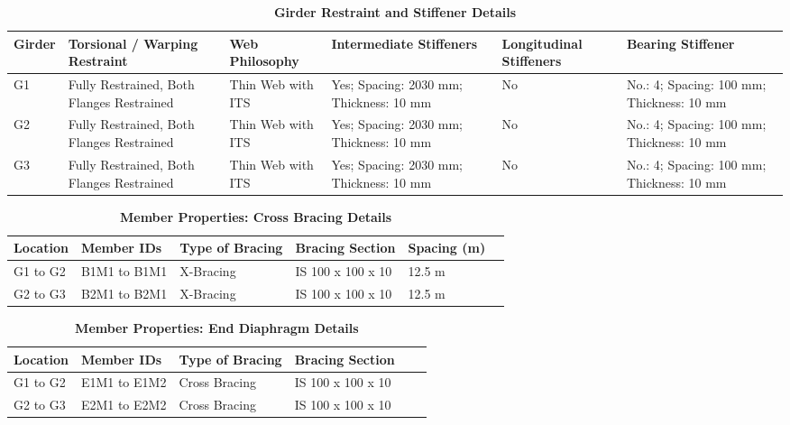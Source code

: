 \documentclass[12pt,a4paper]{report}
\numberwithin{table}{chapter}
\numberwithin{figure}{chapter}
\begin{document}
\vspace{4pt}
\begin{longtable}{|L{1.4cm}|p{2.2cm}|p{2.2cm}|p{3.0cm}|p{2.4cm}|p{2.2cm}|}
\caption{\textbf{Girder Restraint and Stiffener Details}}\\
\hline
\textbf{Girder} & \textbf{Torsional / Warping Restraint} & \textbf{Web Philosophy} & \textbf{Intermediate Stiffeners} & \textbf{Longitudinal Stiffeners} & \textbf{Bearing Stiffener} \\[6pt]
\hline
\endfirsthead
\endhead

G1 & Fully Restrained, Both Flanges Restrained & Thin Web with ITS & Yes; Spacing: 2030 mm; Thickness: 10 mm & No & No.: 4; Spacing: 100 mm; Thickness: 10 mm \\[8pt]
\hline
G2 & Fully Restrained, Both Flanges Restrained & Thin Web with ITS & Yes; Spacing: 2030 mm; Thickness: 10 mm & No & No.: 4; Spacing: 100 mm; Thickness: 10 mm \\[8pt]
\hline
G3 & Fully Restrained, Both Flanges Restrained & Thin Web with ITS & Yes; Spacing: 2030 mm; Thickness: 10 mm & No & No.: 4; Spacing: 100 mm; Thickness: 10 mm \\[8pt]
\hline
\end{longtable}



\newpage

\vspace{0.4em}
\setlength{\tabcolsep}{4pt}
\setlength\LTleft{0pt}
\setlength\LTright{\fill}

\begin{longtable}{|L{2.2cm}|L{2.2cm}|L{3.0cm}|L{2.5cm}|C{1.8cm}|C{1.8cm}|}
\caption{\textbf{Member Properties: Cross Bracing Details}}
\\
\hline
\textbf{Location} & \textbf{Member IDs} & \textbf{Type of Bracing} & \textbf{Bracing Section} & \textbf{Spacing (m)} \\
\hline
G1 to G2 & B1M1 to B1M1 & X-Bracing & IS 100 x 100 x 10 & 12.5 m \\[6pt]
\hline
G2 to G3 & B2M1 to B2M1 & X-Bracing & IS 100 x 100 x 10 & 12.5 m \\[6pt]
\hline
\end{longtable}

\vspace{0.4em}
\noindent
\setlength{\tabcolsep}{4pt}
\setlength\LTleft{0pt}
\setlength\LTright{\fill}

\begin{longtable}{|L{2.2cm}|L{2.2cm}|L{3.0cm}|L{2.5cm}|C{1.8cm}|C{1.8cm}|}
\caption{\textbf{Member Properties: End Diaphragm Details}}
\\
\hline
\textbf{Location} & \textbf{Member IDs} & \textbf{Type of Bracing} & \textbf{Bracing Section} \\
\hline
G1 to G2 & E1M1 to E1M2 & Cross Bracing & IS 100 x 100 x 10 \\[6pt]
\hline
G2 to G3 & E2M1 to E2M2 & Cross Bracing & IS 100 x 100 x 10 \\[6pt]
\hline
\end{longtable}
\end{document}
